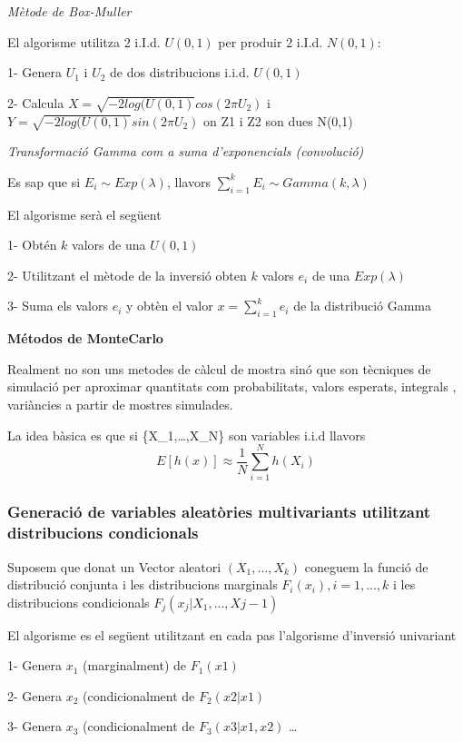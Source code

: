 \documentclass[
  catalan,
]{article}
\theoremstyle{definition}
\theoremstyle{definition}
\theoremstyle{definition}
\theoremstyle{definition}
\theoremstyle{remark}
\begin{document}
\emph{Mètode de Box-Muller}

El algorisme utilitza 2 i.I.d. \(U(0,1)\) per produir 2 i.I.d. \(N(0,1)\):

1- Genera \(U_1\) i \(U_2\) de dos distribucions i.i.d. \(U(0,1)\)

2- Calcula \(X=\sqrt{-2log(U(0,1)}cos(2\pi U_2)\) i \(Y=\sqrt{-2log(U(0,1)}sin(2\pi U_2)\) on Z1 i Z2 son dues N(0,1)

\emph{Transformació Gamma com a suma d'exponencials (convolució) }

Es sap que si \(E_i \sim Exp(\lambda)\), llavors \(\sum_{i=1}^k E_i \sim Gamma (k,\lambda)\)

El algorisme serà el següent

1- Obtén \(k\) valors de una \(U(0,1)\)

2- Utilitzant el mètode de la inversió obten \(k\) valors \(e_i\) de una \(Exp(\lambda)\)

3- Suma els valors \(e_i\) y obtèn el valor \(x=\sum_{i=1}^k e_i\) de la distribució Gamma

\textbf{Métodos de MonteCarlo}

Realment no son uns metodes de càlcul de mostra sinó que son tècniques de simulació per aproximar quantitats com probabilitats, valors esperats, integrals , variàncies a partir de mostres simulades.

La idea bàsica es que si \{X\_1,\ldots,X\_N\} son variables i.i.d llavors
\[
E[h(x)] \approx \dfrac {1}{N} \sum_{i=1}^{N}h(X_i)
\]

\subsubsection{Generació de variables aleatòries multivariants utilitzant distribucions condicionals}\label{generaciuxf3-de-variables-aleatuxf2ries-multivariants-utilitzant-distribucions-condicionals}

Suposem que donat un Vector aleatori \((X_1,...,X_k)\) coneguem la funció de distribució conjunta i les distribucions marginals \(F_i(x_i), i=1,...,k\) i les distribucions condicionals \(F_{j}(x_j|X_1,...,X{j-1})\)

El algorisme es el següent utilitzant en cada pas l'algorisme d'inversió univariant

1- Genera \(x_1\) (marginalment) de \(F_1(x1)\)

2- Genera \(x_2\) (condicionalment de \(F_2(x2 |x1)\)

3- Genera \(x_3\) (condicionalment de \(F_3(x3 |x1,x2)\)
\ldots{}
\end{document}
